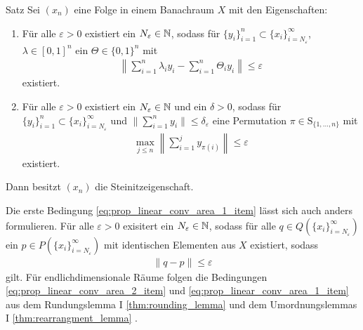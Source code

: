 \begin{genericthm}{Satz}\label{th:prop_linear_conv_area}
	Sei  $ (x_n) $ eine Folge in einem Banachraum $ X $ mit den Eigenschaften:
	\begin{enumerate}
		\item\label{eq:prop_linear_conv_area_2_item}
		Für alle $ \varepsilon > 0 $ existiert ein $ N_\varepsilon \in \mathbb{N} $,
		sodass für $ \{y_i\}_{i =1}^n \subset \{x_i \}_{i = N_\varepsilon}^\infty$, $ \lambda \in [0,1]^n $
		ein $ \Theta \in \{0,1\}^n $ mit
		\begin{align}\label{eq:prop_linear_conv_area_2}
			\left\| \sum \limits_{i = 1}^n \lambda_i y_{i}- 
			\sum \limits_{i = 1}^n
			\Theta_i y_i \right\| \leq \varepsilon
		\end{align}
		existiert.
		
		\item\label{eq:prop_linear_conv_area_1_item} 
		Für alle $ \varepsilon > 0 $ existiert ein $ N_\varepsilon \in \mathbb{N} $ und ein $ \delta > 0 $, 
		sodass für $ \{y_i\}_{i =1}^n \subset \{x_i \}_{i = N_\varepsilon}^\infty$
		und $ \| \sum_{i=1}^n y_i \| \leq \delta_\varepsilon $ eine Permutation $ \pi \in \mathrm{S}_{\{1,...,n\}} $ mit
		\begin{align}\label{eq:prop_linear_conv_area_1}
			\max \limits_{j \leq n}
			\left\| \sum \limits_{i = 1}^j y_{\pi(i)} \right\| \leq \varepsilon
		\end{align}
		existiert.
		
	\end{enumerate}
	Dann besitzt $ (x_n) $ die Steinitzeigenschaft.
\end{genericthm}

Die erste Bedingung \ref{eq:prop_linear_conv_area_1_item} lässt sich auch anders formulieren.
Für alle $ \varepsilon > 0  $ exisitert ein $ N_\varepsilon \in \mathbb{N} $, sodass für alle $ q \in Q(\{x_i\}_{i = N_\varepsilon}^{\infty}) $ ein $ p \in P(\{x_i\}_{i = N_\varepsilon}^\infty) $ mit identischen Elementen aus $ X $ existiert, sodass 
\begin{align*}
	\| q - p \| 
	\leq \varepsilon
\end{align*}
gilt. 
Für endlichdimensionale Räume folgen die Bedingungen \ref{eq:prop_linear_conv_area_2_item} und \ref{eq:prop_linear_conv_area_1_item}
aus dem Rundungslemma I \ref{thm:rounding_lemma} und dem Umordnungslemmas I 
\ref{thm:rearrangment_lemma} .

